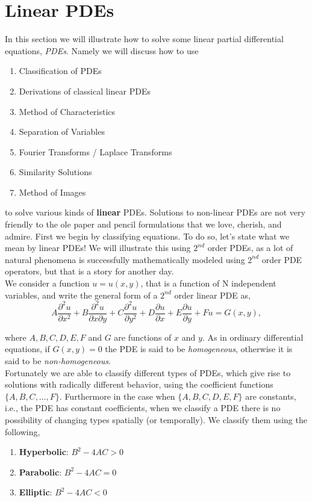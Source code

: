 \graphicspath{{./Linear_PDEs/}}

\section{Linear PDEs}

In this section we will illustrate how to solve some linear partial differential equations, \emph{PDEs}. Namely we will discuss how to use
\begin{enumerate}
\item Classification of PDEs
\item Derivations of classical linear PDEs
\item Method of Characteristics
\item Separation of Variables
\item Fourier Transforms / Laplace Transforms
\item Similarity Solutions
\item Method of Images
\end{enumerate}

to solve various kinds of {\bf{linear}} PDEs. Solutions to non-linear PDEs are not very friendly to the ole paper and pencil formulations that we love, cherish, and admire. First we begin by classifying equations. To do so, let's state what we mean by linear PDEs! We will illustrate this using $2^{nd}$ order PDEs, as a lot of natural phenomena is successfully mathematically modeled using $2^{nd}$ order PDE operators, but that is a story for another day. \\

We consider a function $u=u(x,y)$, that is a function of N independent variables, and write the general form of a $2^{nd}$ order linear PDE as,
\begin{equation}
\label{2nd_order_pde} A \frac{ \partial^2 u}{\partial x^2} + B \frac{ \partial^2 u}{\partial x\partial y} + C \frac{ \partial^2 u}{\partial y^2} + D \frac{\partial u}{\partial x} + E \frac{\partial u}{\partial y} + Fu = G(x,y),
\end{equation}

where $A,B,C,D,E,F$ and $G$ are functions of $x$ and $y$. As in ordinary differential equations, if $G(x,y)=0$ the PDE is said to be \emph{homogeneous}, otherwise it is said to be \emph{non-homogeneous}.\\

Fortunately we are able to classify different types of PDEs, which give rise to solutions with radically different behavior, using the coefficient functions $\{A,B,C,\ldots,F\}$. Furthermore in the case when $\{A,B,C,D,E,F\}$ are constants, i.e., the PDE has constant coefficients, when we classify a PDE there is no possibility of changing types spatially (or temporally). We classify them using the following, 
\begin{enumerate}
\item {\bf{Hyperbolic}}: $B^2 - 4AC > 0$
\item {\bf{Parabolic}}: $B^2 - 4AC = 0$
\item {\bf{Elliptic}}: $B^2 - 4AC < 0$
\end{enumerate}

